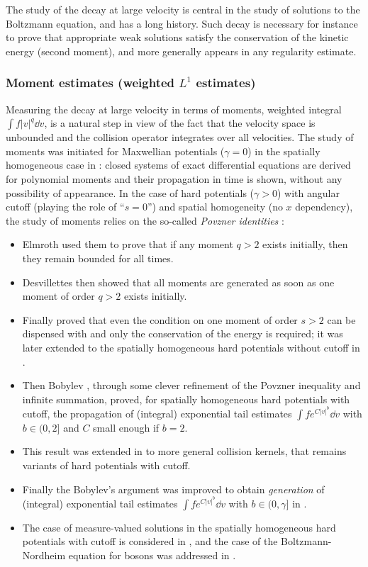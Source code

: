 The study of the decay at large velocity is central in the study of
solutions to the Boltzmann equation, and has a long history. Such
decay is necessary for instance to prove that appropriate weak
solutions satisfy the conservation of the kinetic energy (second
moment), and more generally appears in any regularity estimate.

\subsubsection{Moment estimates (weighted $L^1$ estimates)}
Measuring the decay at large velocity in terms of moments,
\ie weighted integral $\int f |v|^q \dd v$, is a natural step in view
of the fact that the velocity space is unbounded and the collision
operator integrates over all velocities. The study of moments was
initiated for Maxwellian potentials ($\gamma=0$) in the spatially
homogeneous case in \cite{MR0075725,MR0075726}: closed systems of
exact differential equations are derived for polynomial moments and
their propagation in time is shown, without any possibility of
appearance. In the case of hard potentials ($\gamma>0$) with angular
cutoff (playing the role of ``$s=0$'') and spatial homogeneity (no $x$
dependency), the study of moments relies on the so-called
\emph{Povzner identities} \cite{MR0142362}:
\begin{itemize}
\item Elmroth \cite{MR684411} used them to prove that if any moment $q>2$
exists initially, then they remain bounded
for all times.
\item Desvillettes \cite{MR1233644} then showed that all moments are
generated as soon as one moment of order $q>2$ exists initially.
\item Finally \cite{MR1697562,MR1716814} proved that even the
condition on one moment of order $s>2$ can be dispensed with and
only the conservation of the energy is required; it was later
extended to the spatially homogeneous hard potentials without cutoff
in \cite{MR1461113}.
\item Then Bobylev \cite{MR1478067}, through some clever refinement of
the Povzner inequality and infinite summation, proved, for
spatially homogeneous hard potentials with cutoff, the propagation
of (integral) exponential tail estimates $\int f e^{C|v|^b} \dd v$
with $b \in (0,2]$ and $C$ small enough if $b=2$.
\item This result was extended in \cite{MR2096050} to more general
collision kernels, that remains variants of hard potentials with cutoff.
\item Finally the Bobylev's argument was improved to obtain
\emph{generation} of (integral) exponential tail estimates
$\int f e^{C|v|^b}\dd v$ with $b \in (0,\gamma]$ in
\cite{MR2264623,MR3005550}.
\item The case of measure-valued solutions in the spatially
homogeneous hard potentials with cutoff is considered in
\cite{MR2871802}, and the case of the Boltzmann-Nordheim equation
for bosons was addressed in \cite{MR3493188}.
\end{itemize}

